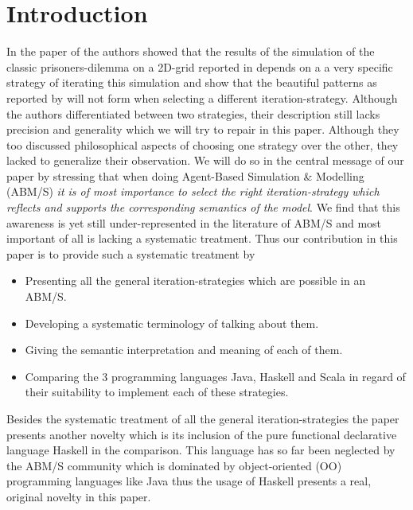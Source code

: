 \section{Introduction}
In the paper of \cite{huberman_evolutionary_1993} the authors showed that the results of the simulation of the classic prisoners-dilemma on a 2D-grid reported in \cite{nowak_evolutionary_1992} depends on a a very specific strategy of iterating this simulation and show that the beautiful patterns as reported by \cite{nowak_evolutionary_1992} will not form when selecting a different iteration-strategy. Although the authors differentiated between two strategies, their description still lacks precision and generality which we will try to repair in this paper. Although they too discussed philosophical aspects of choosing one strategy over the other, they lacked to generalize their observation. We will do so in the central message of our paper by stressing that when doing Agent-Based Simulation \& Modelling (ABM/S) \textit{it is of most importance to select the right iteration-strategy which reflects and supports the corresponding semantics of the model}. We find that this awareness is yet still under-represented in the literature of ABM/S and most important of all is lacking a systematic treatment. Thus our contribution in this paper is to provide such a systematic treatment by
\begin{itemize}
	\item Presenting all the general iteration-strategies which are possible in an ABM/S.
	\item Developing a systematic terminology of talking about them.
	\item Giving the semantic interpretation and meaning of each of them.
	\item Comparing the 3 programming languages Java, Haskell and Scala in regard of their suitability to implement each of these strategies.
\end{itemize}

Besides the systematic treatment of all the general iteration-strategies the paper presents another novelty which is its inclusion of the pure functional declarative language Haskell in the comparison. This language has so far been neglected by the ABM/S community which is dominated by object-oriented (OO) programming languages like Java thus the usage of Haskell presents a real, original novelty in this paper.